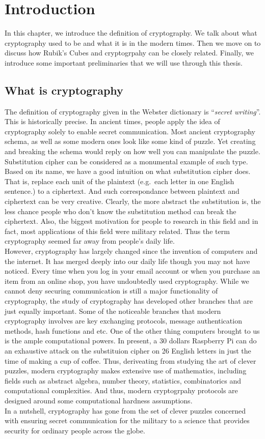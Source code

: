 \doublespacing{}
\chapter{Introduction}
In this chapter, we introduce the definition of cryptography. We talk about what cryptography used to be and what it is in the modern times. Then we move on to discuss how Rubik's Cubes and cryptogrpahy can be closely related. Finally, we introduce some important preliminaries that we will use through this thesis.

\section{What is cryptography}
The definition of cryptography given in the Webster dictionary is ``\textit{secret writing}''. This is historically precise. In ancient times, people apply the idea of cryptography solely to enable secret communication. Most ancient cryptography schema, as well as some modern ones look like some kind of puzzle. Yet creating and breaking the schema would reply on how well you can manipulate the puzzle. Substitution cipher can be considered as a monumental example of such type. Based on its name, we have a good intuition on what substitution cipher does. That is, replace each unit of the plaintext (e.g.\ each letter in one English sentence.) to a ciphertext. And such correspondance between plaintext and ciphertext can be very creative. Clearly, the more abstract the substitution is, the less chance people who don't know the substitution method can break the ciphertext. Also, the biggest motivation for people to research in this field and in fact, most applications of this field were military related. Thus the term cryptography seemed far away from people's daily life. \\
However, cryptography has largely changed since the invention of computers and the internet. It has merged deeply into our daily life though you may not have noticed. Every time when you log in your email account or when you purchase an item from an online shop, you have undoubtedly used cryptography. While we cannot deny securing communication is still a major functionality of cryptography, the study of cryptography has developed other branches that are just equally important. Some of the noticeable branches that modern cryptography involves are key exchanging protocols, message authentication methods, hash functions and etc. One of the other thing computers brought to us is the ample computational powers. In present, a 30 dollars Raspberry Pi can do an exhaustive attack on the substituion cipher on 26 English letters in just the time of making a cup of coffee. Thus, deriveating from studying the art of clever puzzles, modern cryptography makes extensive use of mathematics, including fields such as abstract algebra, number theory, statistics, combinatorics and computational complexities. And thus, modern cryptogrpahy protocols are designed around some computational hardness assumptions. \\
In a nutshell, cryptography has gone from the set of clever puzzles concerned with ensuring secret communication for the military to a science that provides security for ordinary people across the globe.


